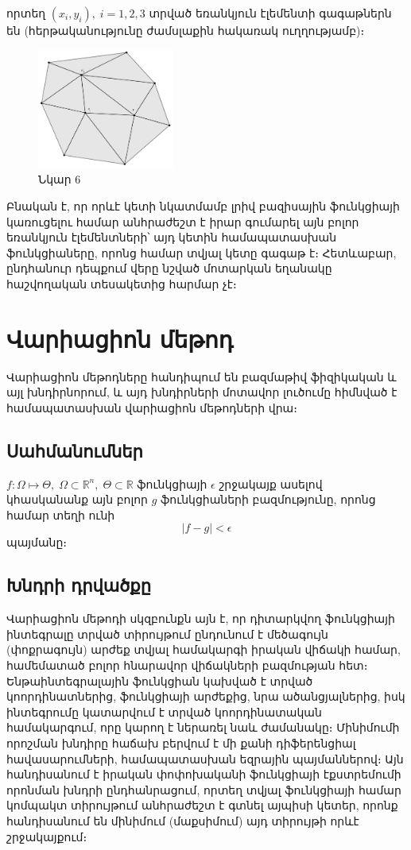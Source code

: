\documentclass[fleqn, bachelor,subf,12pt,notitlepage]{disser}
\begin{document}
\noindent որտեղ $(x_{i}, y_{i}), \; i=1, 2, 3$ տրված եռանկյուն էլեմենտի գագաթներն են (հերթականությունը ժամսլաքին հակառակ ուղղությամբ)։

\begin{figure}[h!]
\centering
\includegraphics[width=0.4\textwidth]{images/two_var_triangular}
\captionsetup{labelformat=empty}
\caption{\hfill Նկար 6}
\end{figure}

\noindent Բնական է, որ որևէ կետի նկատմամբ լրիվ բազիսային ֆունկցիայի կառուցելու համար անհրաժեշտ է իրար գումարել այն բոլոր եռանկյուն էլեմենտների՝ այդ կետին համապատասխան ֆունկցիաները, որոնց համար տվյալ կետը գագաթ է։ Հետևաբար, ընդհանուր դեպքում վերը նշված մոտարկան եղանակը հաշվողական տեսակետից հարմար չէ։

\newpage
\section*{Վարիացիոն մեթոդ}

Վարիացիոն մեթոդները հանդիպում են բազմաթիվ ֆիզիկական և այլ խնդիրնորում, և այդ խնդիրների մոտավոր լուծումը հիմնված է համապատասխան վարիացիոն մեթոդների վրա։

\subsection*{Սահմանումներ}
$f : \Omega \mapsto \Theta, \; \Omega \subset \mathbb{R}^{n}, \; \Theta \subset \mathbb{R}$ ֆունկցիայի $\epsilon$ շրջակայք ասելով կհասկանանք այն բոլոր $g$ ֆունկցիաների բազմությունը, որոնց համար տեղի ունի
$$ \left|f-g\right| < \epsilon$$
պայմանը։



\subsection*{Խնդրի դրվածքը}

Վարիացիոն մեթոդի սկզբունքն այն է, որ դիտարկվող ֆունկցիայի ինտեգրալը տրված տիրույթում ընդունում է մեծագույն (փոքրագույն) արժեք տվյալ համակարգի իրական վիճակի համար, համեմատած բոլոր հնարավոր վիճակների բազմության հետ։ Ենթաինտեգրալային ֆունկցիան կախված է տրված կոորդինատներից, ֆունկցիայի արժեքից, նրա ածանցյալներից, իսկ ինտեգրումը կատարվում է տրված կոորդինատական համակարգում, որը կարող է ներառել նաև ժամանակը։ Մինիմումի որոշման խնդիրը հաճախ բերվում է մի քանի դիֆերենցիալ հավասարումների, համապատասխան եզրային պայմաններով։ \newline Այն հանդիսանում է իրական փոփոխականի ֆունկցիայի էքստրեմումի որոնման խնդրի ընդհանրացում, որտեղ տվյալ ֆունկցիայի համար կոմպակտ տիրույթում անհրաժեշտ է գտնել այպիսի կետեր, որոնք հանդիսանում են մինիմում (մաքսիմում) այդ տիրույթի որևէ շրջակայքում։
\end{document}
